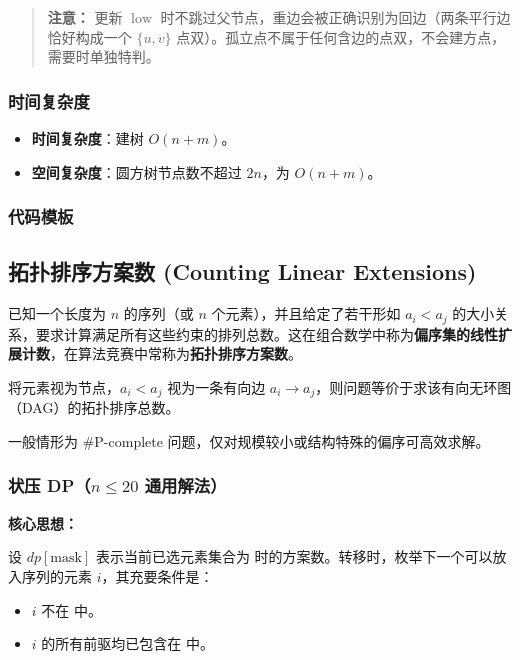 \begin{quote}
\textbf{注意：} 更新 $\operatorname{low}$ 时不跳过父节点，重边会被正确识别为回边（两条平行边恰好构成一个 $\{u, v\}$ 点双）。孤立点不属于任何含边的点双，不会建方点，需要时单独特判。
\end{quote}

\subsubsection{时间复杂度}

\begin{itemize}
  \item \textbf{时间复杂度}：建树 $O(n + m)$。
  \item \textbf{空间复杂度}：圆方树节点数不超过 $2n$，为 $O(n + m)$。
\end{itemize}

\subsubsection{代码模板}



\subsection{拓扑排序方案数 (Counting Linear Extensions)}

已知一个长度为 $n$ 的序列（或 $n$ 个元素），并且给定了若干形如 $a_i < a_j$ 的大小关系，要求计算满足所有这些约束的排列总数。这在组合数学中称为\textbf{偏序集的线性扩展计数}，在算法竞赛中常称为\textbf{拓扑排序方案数}。

将元素视为节点，$a_i < a_j$ 视为一条有向边 $a_i \to a_j$，则问题等价于求该有向无环图（DAG）的拓扑排序总数。

一般情形为 \#P-complete 问题，仅对规模较小或结构特殊的偏序可高效求解。

\subsubsection{状压 DP（$n \le 20$ 通用解法）}

\textbf{核心思想：}

设 $\mathit{dp}[\text{mask}]$ 表示当前已选元素集合为  时的方案数。转移时，枚举下一个可以放入序列的元素 $i$，其充要条件是：

\begin{itemize}
  \item $i$ 不在  中。
  \item $i$ 的所有前驱均已包含在  中。
\end{itemize}

